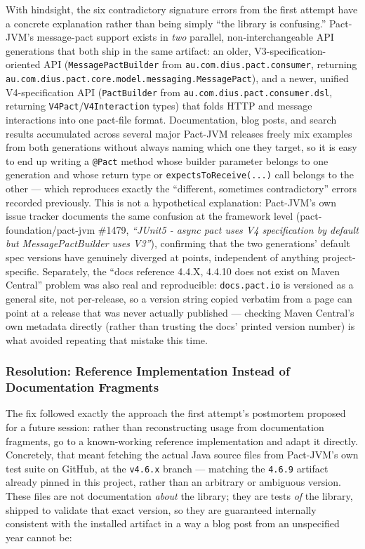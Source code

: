 With hindsight, the six contradictory signature errors from the first attempt have a concrete explanation rather than being simply ``the library is confusing.'' Pact-JVM's message-pact support exists in \emph{two} parallel, non-interchangeable API generations that both ship in the same artifact: an older, V3-specification-oriented API (\texttt{MessagePactBuilder} from \texttt{au.com.dius.pact.consumer}, returning \texttt{au.com.dius.pact.core.model.messaging.MessagePact}), and a newer, unified V4-specification API (\texttt{PactBuilder} from \texttt{au.com.dius.pact.consumer.dsl}, returning \texttt{V4Pact}/\texttt{V4Interaction} types) that folds HTTP and message interactions into one pact-file format. Documentation, blog posts, and search results accumulated across several major Pact-JVM releases freely mix examples from both generations without always naming which one they target, so it is easy to end up writing a \texttt{@Pact} method whose builder parameter belongs to one generation and whose return type or \texttt{expectsToReceive(...)} call belongs to the other --- which reproduces exactly the ``different, sometimes contradictory'' errors recorded previously. This is not a hypothetical explanation: Pact-JVM's own issue tracker documents the same confusion at the framework level (pact-foundation/pact-jvm \#1479, \emph{``JUnit5 - async pact uses V4 specification by default but MessagePactBuilder uses V3''}), confirming that the two generations' default spec versions have genuinely diverged at points, independent of anything project-specific. Separately, the ``docs reference 4.4.X, 4.4.10 does not exist on Maven Central'' problem was also real and reproducible: \texttt{docs.pact.io} is versioned as a general site, not per-release, so a version string copied verbatim from a page can point at a release that was never actually published --- checking Maven Central's own metadata directly (rather than trusting the docs' printed version number) is what avoided repeating that mistake this time.

\subsubsection{Resolution: Reference Implementation Instead of Documentation Fragments}

The fix followed exactly the approach the first attempt's postmortem proposed for a future session: rather than reconstructing usage from documentation fragments, go to a known-working reference implementation and adapt it directly. Concretely, that meant fetching the actual Java source files from Pact-JVM's own test suite on GitHub, at the \texttt{v4.6.x} branch --- matching the \texttt{4.6.9} artifact already pinned in this project, rather than an arbitrary or ambiguous version. These files are not documentation \emph{about} the library; they are tests \emph{of} the library, shipped to validate that exact version, so they are guaranteed internally consistent with the installed artifact in a way a blog post from an unspecified year cannot be:

